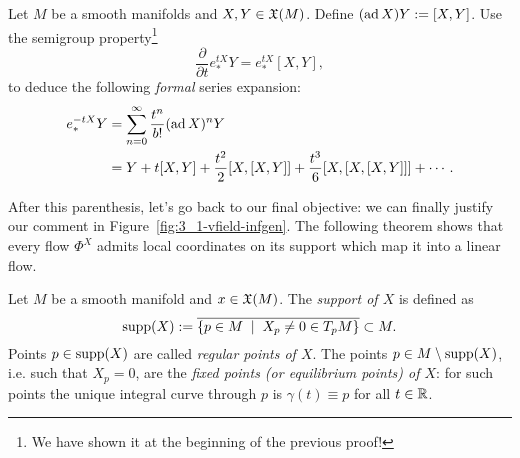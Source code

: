 \begin{exercise}
  Let $M$ be a smooth manifolds and $X,Y\in\mathfrak{X}(M)$.
  Define $(\operatorname{ad} X) Y := [X,Y]$.
  Use the semigroup property\footnote{We have shown it at the beginning of the previous proof!}
  \begin{equation}
    \frac{\partial}{\partial t} e_*^{tX} Y = e_*^{tX}[X,Y],
  \end{equation}
  to deduce the following \emph{formal} series expansion:
  \begin{align}
    e_*^{-tX} Y
    &= \sum_{n=0}^\infty \frac{t^n}{b!}(\operatorname{ad} X)^n Y \\
    &= Y + t[X,Y] + \frac{t^2}{2}[X, [X, Y]] + \frac{t^3}{6} [X,[X,[X,Y]]] + \cdots.
  \end{align}
\end{exercise}

After this parenthesis, let's go back to our final objective: we can finally justify our comment in Figure~\ref{fig:3_1-vfield-infgen}.
The following theorem shows that every flow $\Phi^X$ admits local coordinates on its support which map it into a linear flow.

\begin{definition}
  Let $M$ be a smooth manifold and $x\in\mathfrak{X}(M)$. 
  The \emph{support of $X$} is defined as
  \begin{equation}
    \operatorname{supp}(X):=\overline{\left\lbrace p\in M \;\mid\; X_p\neq 0 \in T_p M\right\rbrace}\subset M.
  \end{equation}
  Points $p\in\operatorname{supp}(X)$ are called \emph{regular points of $X$}.
  The points $p\in M\setminus\operatorname{supp}(X)$, i.e. such that $X_p = 0$, are the \emph{fixed points (or equilibrium points) of $X$}: for such points the unique integral curve through $p$ is $\gamma(t) \equiv p$ for all $t\in\mathbb{R}$. 
\end{definition}


